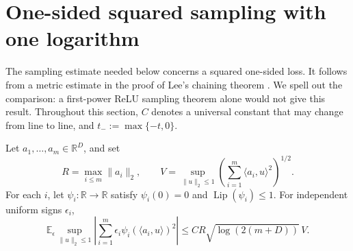 \section{One-sided squared sampling with one logarithm}
\label{sec:sampling}

The sampling estimate needed below concerns a squared one-sided loss.
It follows from a metric estimate in the proof of Lee's chaining theorem
\cite[Lemma~2.12, equation~(2.20)]{Lee2023}. We spell out the comparison:
a first-power ReLU sampling theorem alone would not give this result.
Throughout this section, $C$ denotes a universal constant that may change
from line to line, and $t_-:=\max\{-t,0\}$.

\begin{lemma}\label{lem:squared-process}
Let $a_1,\ldots,a_m\in\mathbb R^D$, and set
\[
 R=\max_{i\le m}\|a_i\|_2,
 \qquad V=\sup_{\|u\|_2\le1}
       \left(\sum_{i=1}^m\langle a_i,u\rangle^2\right)^{1/2}.
\]
For each $i$, let $\psi_i:\mathbb R\to\mathbb R$ satisfy
$\psi_i(0)=0$ and $\operatorname{Lip}(\psi_i)\le1$.
For independent uniform signs $\epsilon_i$,
\begin{equation}\label{eq:squared-process}
 \mathbb E_\epsilon\sup_{\|u\|_2\le1}
 \left|\sum_{i=1}^m\epsilon_i\psi_i(\langle a_i,u\rangle)^2\right|
 \le C R\sqrt{\log(2(m+D))}\,V.
\end{equation}
\end{lemma}

